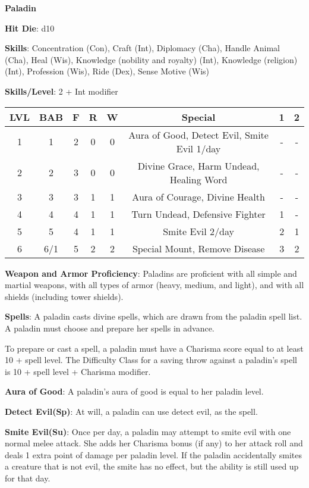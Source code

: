 \textbf{\huge{Paladin}}

\textbf{Hit Die}: d10

\textbf{Skills}: Concentration (Con), Craft (Int), Diplomacy (Cha), Handle Animal (Cha), Heal (Wis), Knowledge (nobility and royalty) (Int), Knowledge (religion) (Int), Profession (Wis), Ride (Dex), Sense Motive (Wis)

\textbf{Skills/Level}: 2 + Int modifier

\begin{center}
\begin{adjustwidth}{-4cm}{}
\begin{small}
\begin{tabular}{| c | c | c | c | c | c | c | c |}
\hline
LVL &BAB &F &R &W &Special &1 &2 \\
\hline
1 &1 &2 &0 &0 &Aura of Good, Detect Evil, Smite Evil 1/day &- &- \\
2 &2 &3 &0 &0 &Divine Grace, Harm Undead, Healing Word &- &- \\
3 &3 &3 &1 &1 &Aura of Courage, Divine Health &- &- \\
4 &4 &4 &1 &1 &Turn Undead, Defensive Fighter &1 &- \\
5 &5 &4 &1 &1 &Smite Evil 2/day &2 &1 \\
6 &6/1 &5 &2 &2 &Special Mount, Remove Disease &3 &2 \\
\hline
\end{tabular}
\end{small}
\end{adjustwidth}
\end{center}

\textbf{Weapon and Armor Proficiency}: Paladins are proficient with all simple and martial weapons, with all types of armor (heavy, medium, and light), and with all shields (including tower shields).

\textbf{Spells}: A paladin casts divine spells, which are drawn from the paladin spell list. A paladin must choose and prepare her spells in advance. 

To prepare or cast a spell, a paladin must have a Charisma score equal to at least 10 + spell level. The Difficulty Class for a saving throw against a paladin's spell is 10 + spell level + Charisma modifier. 

\textbf{Aura of Good}: A paladin's aura of good is equal to her paladin level.

\textbf{Detect Evil(Sp)}: At will, a paladin can use detect evil, as the spell.

\textbf{Smite Evil(Su)}: Once per day, a paladin may attempt to smite evil with one normal melee attack. She adds her Charisma bonus (if any) to her attack roll and deals 1 extra point of damage per paladin level. If the paladin accidentally smites a creature that is not evil, the smite has no effect, but the ability is still used up for that day. 

